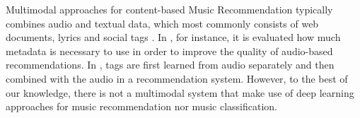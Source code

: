 
Multimodal approaches for content-based Music Recommendation typically combines audio and textual data, which most commonly consists of web documents, lyrics and social tags \citep{liem2011need}. In \citep{Bogdanov2011}, for instance, it is evaluated how much metadata is necessary to use in order to improve the quality of  audio-based recommendations. In \citep{Eck:NIPS2007}, tags are first learned from audio separately and then combined with the audio in a recommendation system. However, to the best of our knowledge, there is not a multimodal system that make use of deep learning approaches for music recommendation nor music classification.

